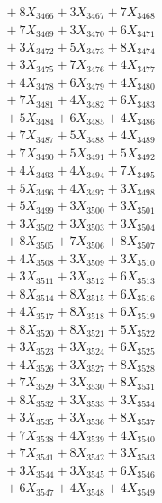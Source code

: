 \documentclass[a4paper,10pt]{article}
\begin{document}
{\begin{align}
&\;  + 8 X_{3466} + 3 X_{3467} + 7 X_{3468} \\[0.3ex]
&\;  + 7 X_{3469} + 3 X_{3470} + 6 X_{3471} \\[0.3ex]
&\;  + 3 X_{3472} + 5 X_{3473} + 8 X_{3474} \\[0.3ex]
&\;  + 3 X_{3475} + 7 X_{3476} + 4 X_{3477} \\[0.3ex]
&\;  + 4 X_{3478} + 6 X_{3479} + 4 X_{3480} \\[0.3ex]
&\;  + 7 X_{3481} + 4 X_{3482} + 6 X_{3483} \\[0.3ex]
&\;  + 5 X_{3484} + 6 X_{3485} + 4 X_{3486} \\[0.3ex]
&\;  + 7 X_{3487} + 5 X_{3488} + 4 X_{3489} \\[0.5ex]\allowbreak
&\;  + 7 X_{3490} + 5 X_{3491} + 5 X_{3492} \\[0.3ex]
&\;  + 4 X_{3493} + 4 X_{3494} + 7 X_{3495} \\[0.3ex]
&\;  + 5 X_{3496} + 4 X_{3497} + 3 X_{3498} \\[0.3ex]
&\;  + 5 X_{3499} + 3 X_{3500} + 3 X_{3501} \\[0.3ex]
&\;  + 3 X_{3502} + 3 X_{3503} + 3 X_{3504} \\[0.3ex]
&\;  + 8 X_{3505} + 7 X_{3506} + 8 X_{3507} \\[0.3ex]
&\;  + 4 X_{3508} + 3 X_{3509} + 3 X_{3510} \\[0.3ex]
&\;  + 3 X_{3511} + 3 X_{3512} + 6 X_{3513} \\[0.3ex]
&\;  + 8 X_{3514} + 8 X_{3515} + 6 X_{3516} \\[0.3ex]
&\;  + 4 X_{3517} + 8 X_{3518} + 6 X_{3519} \\[0.5ex]\allowbreak
&\;  + 8 X_{3520} + 8 X_{3521} + 5 X_{3522} \\[0.3ex]
&\;  + 3 X_{3523} + 3 X_{3524} + 6 X_{3525} \\[0.3ex]
&\;  + 4 X_{3526} + 3 X_{3527} + 8 X_{3528} \\[0.3ex]
&\;  + 7 X_{3529} + 3 X_{3530} + 8 X_{3531} \\[0.3ex]
&\;  + 8 X_{3532} + 3 X_{3533} + 3 X_{3534} \\[0.3ex]
&\;  + 3 X_{3535} + 3 X_{3536} + 8 X_{3537} \\[0.3ex]
&\;  + 7 X_{3538} + 4 X_{3539} + 4 X_{3540} \\[0.3ex]
&\;  + 7 X_{3541} + 8 X_{3542} + 3 X_{3543} \\[0.3ex]
&\;  + 3 X_{3544} + 3 X_{3545} + 6 X_{3546} \\[0.3ex]
&\;  + 6 X_{3547} + 4 X_{3548} + 4 X_{3549} \\[0.5ex]\allowbreak

\end{align}}
\end{document}
